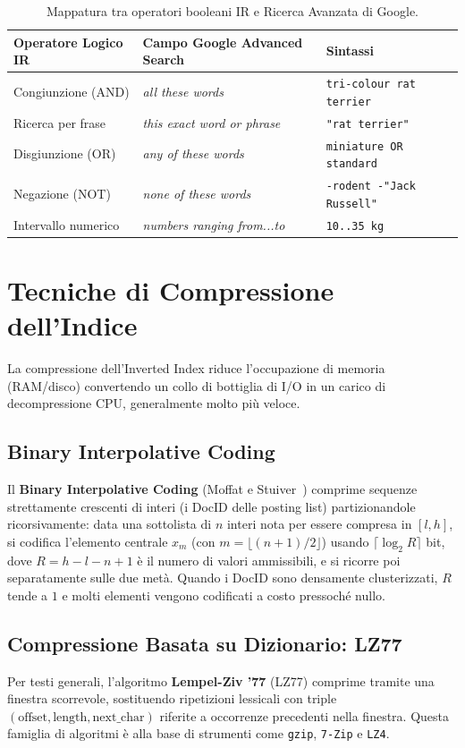 \begin{table}[htbp]
\centering
\small
\begin{tabularx}{\textwidth}{p{3.2cm} p{3.6cm} X}
\toprule
\textbf{Operatore Logico IR} & \textbf{Campo Google Advanced Search} & \textbf{Sintassi} \\
\midrule
Congiunzione (AND) & \textit{all these words} & \texttt{tri-colour rat terrier} \\
Ricerca per frase & \textit{this exact word or phrase} & \texttt{"rat terrier"} \\
Disgiunzione (OR) & \textit{any of these words} & \texttt{miniature OR standard} \\
Negazione (NOT) & \textit{none of these words} & \texttt{-rodent -"Jack Russell"} \\
Intervallo numerico & \textit{numbers ranging from...to} & \texttt{10..35 kg} \\
\bottomrule
\end{tabularx}
\caption{Mappatura tra operatori booleani IR e Ricerca Avanzata di Google.}
\label{tab:google-advanced-search}
\end{table}

\FloatBarrier
\section{Tecniche di Compressione dell'Indice}

La compressione dell'Inverted Index riduce l'occupazione di memoria (RAM/disco) convertendo un collo di bottiglia di I/O in un carico di decompressione CPU, generalmente molto pi\`u veloce.

\subsection{Binary Interpolative Coding}
Il \textbf{Binary Interpolative Coding} (Moffat e Stuiver~\cite{moffat2000}) comprime sequenze strettamente crescenti di interi (i DocID delle posting list) partizionandole ricorsivamente: data una sottolista di $n$ interi nota per essere compresa in $[l, h]$, si codifica l'elemento centrale $x_m$ (con $m = \lfloor (n+1)/2 \rfloor$) usando $\lceil \log_2 R \rceil$ bit, dove $R = h - l - n + 1$ \`e il numero di valori ammissibili, e si ricorre poi separatamente sulle due met\`a. Quando i DocID sono densamente clusterizzati, $R$ tende a $1$ e molti elementi vengono codificati a costo pressoch\'e nullo.

\subsection{Compressione Basata su Dizionario: LZ77}
Per testi generali, l'algoritmo \textbf{Lempel-Ziv '77} (LZ77) comprime tramite una finestra scorrevole, sostituendo ripetizioni lessicali con triple $(\text{offset}, \text{length}, \text{next\_char})$ riferite a occorrenze precedenti nella finestra. Questa famiglia di algoritmi \`e alla base di strumenti come \texttt{gzip}, \texttt{7-Zip} e \texttt{LZ4}.

